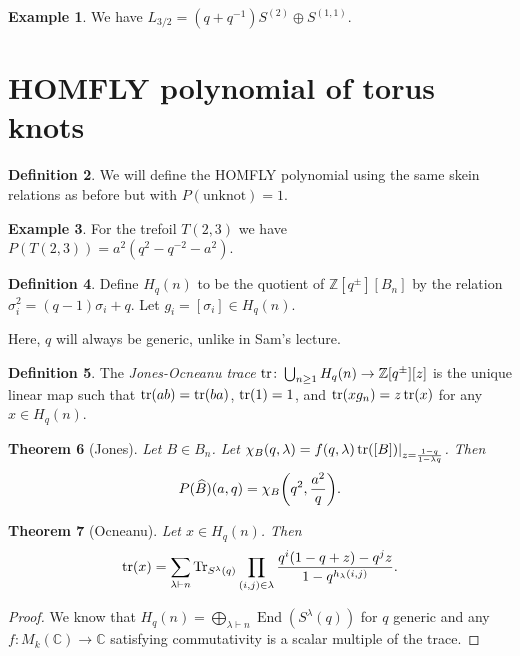 \documentclass[leqno, openany]{memoir}
\newtheorem{thm}{Theorem}[section]
\theoremstyle{definition}
\newtheorem{defn}[thm]{Definition}
\newtheorem{exm}[thm]{Example}
\theoremstyle{remark}
\theoremstyle{plain}
\theoremstyle{definition}
\theoremstyle{remark}
\newcommand{\C}{\mathbb{C}}
\newcommand{\Z}{\mathbb{Z}}
\newcommand{\mr}[1]{\mathrm{#1}}
\newcommand{\wh}[1]{\widehat{#1}}
\newcommand{\1}{\mathbf{1}}
\newcommand{\2}{\mathbf{2}}
\newcommand{\3}{\mathbf{3}}
\DeclareMathOperator{\End}{End}
\begin{document}
\begin{exm}
    We have $L_{3/2} = (q+q^{-1}) S^{(2)} \oplus S^{(1,1)}$.
\end{exm}

\section{HOMFLY polynomial of torus knots}%
\label{sec:homfly_polynomial_of_torus_knots}

\begin{defn}
    We will define the HOMFLY polynomial using the same skein relations as before but with $P(\mr{unknot}) = 1$.
\end{defn}

\begin{exm}
    For the trefoil $T(2,3)$ we have $P(T(2,3)) = a^2(q^2 - q^{-2} - a^2)$.
\end{exm}

\begin{defn}
    Define $H_q(n)$ to be the quotient of $\Z[q^{\pm}][B_n]$ by the relation $\sigma_i^2 = (q-1) \sigma_i + q$. Let $g_i = [\sigma_i] \in H_q(n)$.
\end{defn}

Here, $q$ will always be generic, unlike in Sam's lecture.

\begin{defn}
    The \textit{Jones-Ocneanu trace} $\tr \colon \bigcup_{n \geq 1} H_q(n) \to \Z[q^{\pm}][z]$ is the unique linear map such that $\tr(ab) = \tr(ba)$, $\tr(1) = 1$, and $\tr(x g_n) = z \tr(x)$ for any $x \in H_q(n)$.
\end{defn}

\begin{thm}[Jones]
    Let $B \in B_n$. Let $\chi_B(q, \lambda) = f(q, \lambda) \tr([B])|_{z = \frac{1-q}{1-\lambda q}}$. Then
    \[ P(\wh{B})(a,q) = \chi_B\qty(q^2, \frac{a^2}{q}). \]
\end{thm}

\begin{thm}[Ocneanu]
    Let $x \in H_q(n)$. Then
    \[ \tr(x) = \sum_{\lambda \vdash n} \Tr_{S^{\lambda}(q)} \prod_{(i,j) \in \lambda} \frac{q^i(1-q+z) - q^j z}{1-q^{{h_{\lambda}(i,j)}}}. \]
\end{thm}

\begin{proof}
    We know that $H_q(n) = \bigoplus_{\lambda \vdash n} \End(S^{\lambda}(q))$ for $q$ generic and any $f \colon M_k(\C) \to \C$ satisfying commutativity is a scalar multiple of the trace.
\end{proof}
\end{document}
